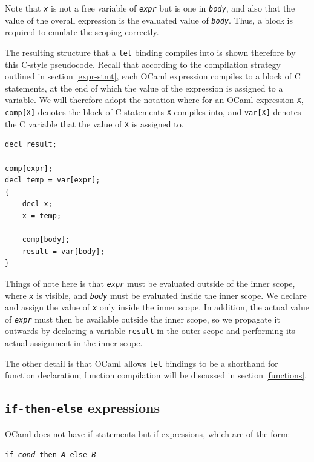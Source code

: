 \documentclass[12pt,a4paper,twoside,openright]{report}
\begin{document}
Note that \texttt{\emph{x}} is not a free variable of \texttt{\emph{expr}} 
but is one in \texttt{\emph{body}}, and also that the value of the overall 
expression is the evaluated value of \texttt{\emph{body}}. Thus, a block is 
required to emulate the scoping correctly.

The resulting structure that a \texttt{let} binding compiles into is shown 
therefore by this C-style pseudocode. Recall that according to the compilation 
strategy outlined in section \ref{expr-stmt}, each OCaml expression compiles to 
a block of C statements, at the end of which the value of the expression is 
assigned to a variable. We will therefore adopt the notation where for an OCaml 
expression \texttt{X}, \texttt{comp[X]} denotes the block of C statements 
\texttt{X} compiles into, and \texttt{var[X]} denotes the C variable that the 
value of \texttt{X} is assigned to.

\begin{lstlisting}
decl result;

comp[expr];
decl temp = var[expr];
{
    decl x;
    x = temp;
    
    comp[body];
    result = var[body];
}
\end{lstlisting}

Things of note here is that \texttt{\emph{expr}} must be evaluated outside of 
the inner scope, where \texttt{\emph{x}} is visible, and \texttt{\emph{body}} 
must be evaluated inside the inner scope. We declare and assign the value of 
\texttt{\emph{x}} only inside the inner scope. In addition, the actual value of 
\texttt{\emph{expr}} must then be available outside the inner scope, so we 
propagate it outwards by declaring a variable \texttt{result} in the outer 
scope and performing its actual assignment in the inner scope.

The other detail is that OCaml allows \texttt{let} bindings to be a shorthand 
for function declaration; function compilation will be discussed in section 
\ref{functions}.

\subsection{\texttt{if-then-else} expressions}

OCaml does not have if-statements but if-expressions, which are of the form:

\begin{center}
    \texttt{if \emph{cond} then \emph{A} else \emph{B}}
\end{center}
\end{document}
